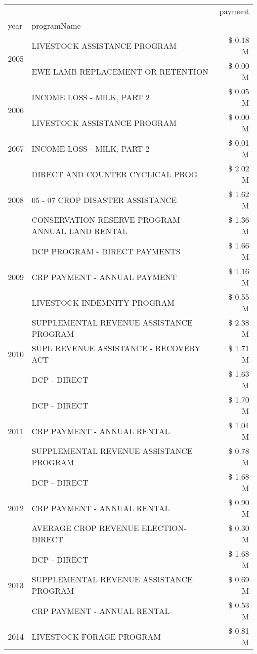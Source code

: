 \begin{tabular}{llr}
\toprule
 &  & payment \\
year & programName &  \\
\midrule
\multirow[t]{2}{*}{2005} & LIVESTOCK ASSISTANCE PROGRAM & \$ 0.18 M \\
 & EWE LAMB REPLACEMENT OR RETENTION & \$ 0.00 M \\
\cline{1-3}
\multirow[t]{2}{*}{2006} & INCOME LOSS - MILK, PART 2 & \$ 0.05 M \\
 & LIVESTOCK ASSISTANCE PROGRAM & \$ 0.00 M \\
\cline{1-3}
2007 & INCOME LOSS - MILK, PART 2 & \$ 0.01 M \\
\cline{1-3}
\multirow[t]{3}{*}{2008} & DIRECT AND COUNTER CYCLICAL PROG & \$ 2.02 M \\
 & 05 - 07 CROP DISASTER ASSISTANCE & \$ 1.62 M \\
 & CONSERVATION RESERVE PROGRAM - ANNUAL LAND RENTAL & \$ 1.36 M \\
\cline{1-3}
\multirow[t]{3}{*}{2009} & DCP PROGRAM - DIRECT PAYMENTS & \$ 1.66 M \\
 & CRP PAYMENT - ANNUAL PAYMENT & \$ 1.16 M \\
 & LIVESTOCK INDEMNITY PROGRAM & \$ 0.55 M \\
\cline{1-3}
\multirow[t]{3}{*}{2010} & SUPPLEMENTAL REVENUE ASSISTANCE PROGRAM & \$ 2.38 M \\
 & SUPL REVENUE ASSISTANCE - RECOVERY ACT & \$ 1.71 M \\
 & DCP - DIRECT & \$ 1.63 M \\
\cline{1-3}
\multirow[t]{3}{*}{2011} & DCP - DIRECT & \$ 1.70 M \\
 & CRP PAYMENT - ANNUAL RENTAL & \$ 1.04 M \\
 & SUPPLEMENTAL REVENUE ASSISTANCE PROGRAM & \$ 0.78 M \\
\cline{1-3}
\multirow[t]{3}{*}{2012} & DCP - DIRECT & \$ 1.68 M \\
 & CRP PAYMENT - ANNUAL RENTAL & \$ 0.90 M \\
 & AVERAGE CROP REVENUE ELECTION-DIRECT & \$ 0.30 M \\
\cline{1-3}
\multirow[t]{3}{*}{2013} & DCP - DIRECT & \$ 1.68 M \\
 & SUPPLEMENTAL REVENUE ASSISTANCE PROGRAM & \$ 0.69 M \\
 & CRP PAYMENT - ANNUAL RENTAL & \$ 0.53 M \\
\cline{1-3}
\multirow[t]{3}{*}{2014} & LIVESTOCK FORAGE PROGRAM & \$ 0.81 M \\

\end{tabular}
